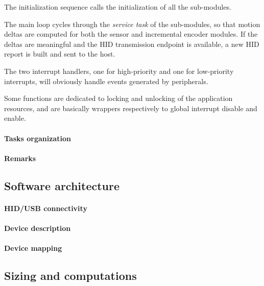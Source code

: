 \documentclass[a4paper,10pt]{article}
\begin{document}
\begin{multicols}{2}
The initialization sequence calls the initialization of all the sub-modules.

The main loop cycles through the \emph{service task} of the sub-modules, so
that motion deltas are computed for both the sensor and incremental encoder
modules. If the deltas are meaningful and the HID transmission endpoint is
available, a new HID report is built and sent to the host.

The two interrupt handlers, one for high-priority and one for low-priority
interrupts, will obviously handle events generated by peripherals.

Some functions are dedicated to locking and unlocking of the application
resources, and are basically wrappers respectively to global interrupt disable
and enable.


\paragraph{Tasks organization}
\TODO


\paragraph{Remarks}
\TODO


\subsection{Software architecture}

\TODO


\paragraph{HID/USB connectivity}
\TODO


\paragraph{Device description}
\TODO


\paragraph{Device mapping}
\TODO


\subsection{Sizing and computations}


\end{multicols}
\end{document}
